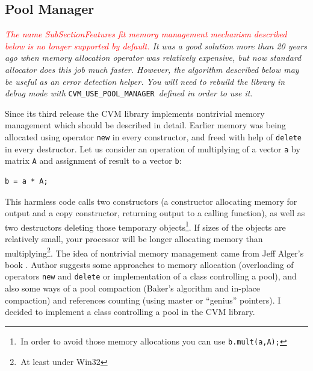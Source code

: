 \subsection{Pool Manager}
\textit{\textcolor{red}{The%
\pdfdest name {SubSectionFeatures} fit{}
memory management mechanism described below is no longer supported
by default.} It was a good solution more than 20 years ago when memory allocation
operator was relatively expensive, but now standard allocator does this job
much faster. However, the algorithm described below may be useful as
an error detection helper. You will need to rebuild the library in debug mode
with}
\verb"CVM_USE_POOL_MANAGER"\, \textit{defined in order to use it}.

Since its third release the CVM library implements
nontrivial memory management
which should be described in detail. Earlier memory was being
allocated using operator \verb"new" in every constructor, and
freed with help of \verb"delete" in every destructor. Let us
consider an operation of multiplying of a vector \verb'a' by matrix
\verb'A' and assignment of result to a vector \verb'b':
\begin{Verbatim}
b = a * A;
\end{Verbatim}
This harmless code calls two constructors (a constructor allocating
memory for output and a copy constructor, returning output to
a calling function), as well as two destructors deleting those
temporary objects\footnote{\,In order to avoid those memory
allocations you can use \verb"b.mult(a,A);"}. If sizes of the
objects are relatively small, your processor will be longer
allocating memory than multiplying\footnote{\,At least under Win32}.
The idea of nontrivial memory management came from Jeff Alger's book
. Author suggests some approaches to
memory allocation (overloading of operators \verb"new" and
\verb"delete" or implementation of a class controlling a pool), and
also some ways of a pool compaction (Baker's algorithm and in-place
compaction) and references counting (using master or ``genius''
pointers). I decided to implement
a class controlling a pool in the CVM library.

